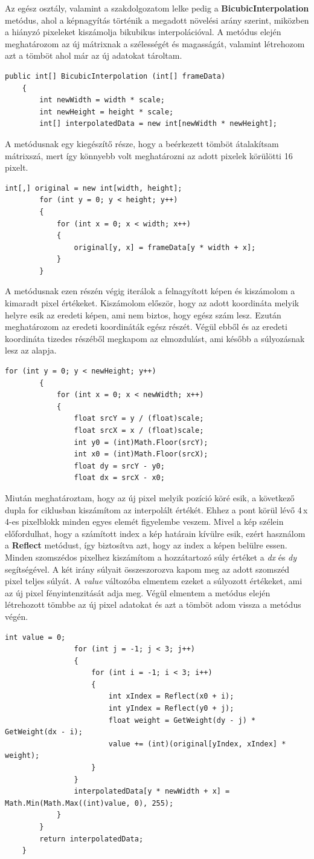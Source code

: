 \documentclass[]{thesis-ekf}
\theoremstyle{definition}
\theoremstyle{remark}
\begin{document}
Az egész osztály, valamint a szakdolgozatom lelke pedig a \textbf{BicubicInterpolation} metódus, ahol a képnagyítás történik a megadott növelési arány szerint, miközben a hiányzó pixeleket kiszámolja bikubikus interpolációval. A metódus elején meghatározom az új mátrixnak a szélességét és magasságát, valamint létrehozom azt a tömböt ahol már az új adatokat tároltam.
\begin{lstlisting}[language=CSharp]
	public int[] BicubicInterpolation (int[] frameData)
	{
		int newWidth = width * scale;
		int newHeight = height * scale;
		int[] interpolatedData = new int[newWidth * newHeight];
\end{lstlisting}
A metódusnak egy kiegészítő része, hogy a beérkezett tömböt átalakítsam mátrixszá, mert így könnyebb volt meghatározni az adott pixelek körülötti 16 pixelt. 
\begin{lstlisting}[language=CSharp]
		int[,] original = new int[width, height];
		for (int y = 0; y < height; y++)
		{
			for (int x = 0; x < width; x++)
			{
				original[y, x] = frameData[y * width + x];
			}
		}
\end{lstlisting}
A metódusnak ezen részén végig iterálok a felnagyított képen és kiszámolom a kimaradt pixel értékeket. Kiszámolom először, hogy az adott koordináta melyik helyre esik az eredeti képen, ami nem biztos, hogy egész szám lesz. Ezután meghatározom az eredeti koordináták egész részét. Végül ebből és az eredeti koordináta tizedes részéből megkapom az elmozdulást, ami később a súlyozásnak lesz az alapja. 
\begin{lstlisting}[language=CSharp]
		for (int y = 0; y < newHeight; y++)
		{
			for (int x = 0; x < newWidth; x++)
			{
				float srcY = y / (float)scale;
				float srcX = x / (float)scale;
				int y0 = (int)Math.Floor(srcY);
				int x0 = (int)Math.Floor(srcX);
				float dy = srcY - y0;
				float dx = srcX - x0;
\end{lstlisting}
Miután meghatároztam, hogy az új pixel melyik pozíció köré esik, a következő dupla for ciklusban kiszámítom az interpolált értékét. Ehhez a pont körül lévő 4\,x\,4-es pixelblokk minden egyes elemét figyelembe veszem. Mivel a kép szélein előfordulhat, hogy a számított index a kép határain kívülre esik, ezért használom a \textbf{Reflect} metódust, így biztosítva azt, hogy az index a képen belülre essen. Minden szomszédos pixelhez kiszámítom a hozzátartozó súly értéket a \emph{dx} és \emph{dy} segítségével. A két irány súlyait összeszorozva kapom meg az adott szomszéd pixel teljes súlyát. A \emph{value} változóba elmentem ezeket a súlyozott értékeket, ami az új pixel fényintenzitását adja meg. Végül elmentem a metódus elején létrehozott tömbbe az új pixel adatokat és azt a tömböt adom vissza a metódus végén.
\begin{lstlisting}[language=CSharp]
				int value = 0;
				for (int j = -1; j < 3; j++)
				{
					for (int i = -1; i < 3; i++)
					{
						int xIndex = Reflect(x0 + i);
						int yIndex = Reflect(y0 + j);
						float weight = GetWeight(dy - j) * GetWeight(dx - i);
						value += (int)(original[yIndex, xIndex] * weight);
					}
				}
				interpolatedData[y * newWidth + x] = Math.Min(Math.Max((int)value, 0), 255);
			}
		}
		return interpolatedData;
	}	
\end{lstlisting}
\end{document}
